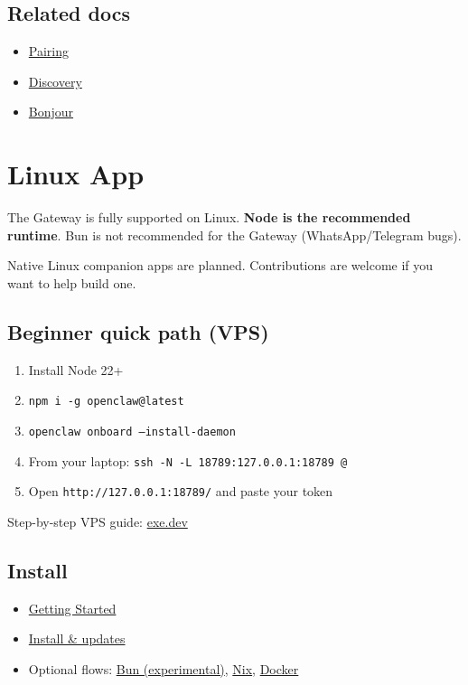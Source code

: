 \subsection{Related docs}


\begin{itemize}
  \item \href{/channels/pairing}{Pairing}
  \item \href{/gateway/discovery}{Discovery}
  \item \href{/gateway/bonjour}{Bonjour}
\end{itemize}



\clearpage

\section{Linux App}


The Gateway is fully supported on Linux. \textbf{Node is the recommended runtime}.
Bun is not recommended for the Gateway (WhatsApp/Telegram bugs).

Native Linux companion apps are planned. Contributions are welcome if you want to help build one.

\subsection{Beginner quick path (VPS)}


\begin{enumerate}
  \item Install Node 22+
  \item \texttt{npm i -g openclaw@latest}
  \item \texttt{openclaw onboard --install-daemon}
  \item From your laptop: \texttt{ssh -N -L 18789:127.0.0.1:18789 @}
  \item Open \texttt{http://127.0.0.1:18789/} and paste your token
\end{enumerate}


Step-by-step VPS guide: \href{/install/exe-dev}{exe.dev}

\subsection{Install}


\begin{itemize}
  \item \href{/start/getting-started}{Getting Started}
  \item \href{/install/updating}{Install \& updates}
  \item Optional flows: \href{/install/bun}{Bun (experimental)}, \href{/install/nix}{Nix}, \href{/install/docker}{Docker}
\end{itemize}



